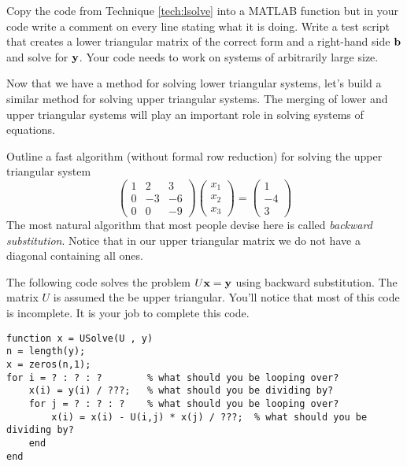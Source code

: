 \begin{problem}
    Copy the code from Technique \ref{tech:lsolve} into a MATLAB function but in your code
    write a comment on every line stating what it is doing.  Write a test script that
    creates a lower triangular matrix of the correct form and a right-hand side ${\bf b}$ and
    solve for ${\bf y}$.  Your code needs to work on systems of arbitrarily large size.
\end{problem}

Now that we have a method for solving lower triangular systems, let's build a similar
method for solving upper triangular systems.  The merging of lower and upper triangular
systems will play an important role in solving systems of equations.
\begin{problem}
    Outline a fast algorithm (without formal row reduction) for solving the upper triangular system
    \[ \begin{pmatrix} 1 & 2 & 3 \\ 0 & -3 & -6 \\ 0 & 0 & -9 \end{pmatrix}
        \begin{pmatrix} x_1 \\ x_2 \\ x_3 \end{pmatrix} = \begin{pmatrix} 1 \\ -4 \\
        3\end{pmatrix} \]
    The most natural algorithm that most people devise here is called {\it backward
    substitution}.  Notice that in our upper triangular matrix we do not have a diagonal
    containing all ones. 
\end{problem}

\begin{technique}\label{tech:usolve}
    The following code solves the problem $U {\bf x} = {\bf y}$ using backward
    substitution.  The matrix $U$ is assumed the be upper triangular.  You'll notice that
    most of this code is incomplete.  It is your job to complete this code.
\begin{lstlisting}
function x = USolve(U , y)
n = length(y);
x = zeros(n,1);
for i = ? : ? : ?        % what should you be looping over?
    x(i) = y(i) / ???;   % what should you be dividing by?
    for j = ? : ? : ?    % what should you be looping over? 
        x(i) = x(i) - U(i,j) * x(j) / ???;  % what should you be dividing by?
    end
end
\end{lstlisting}
\end{technique}

